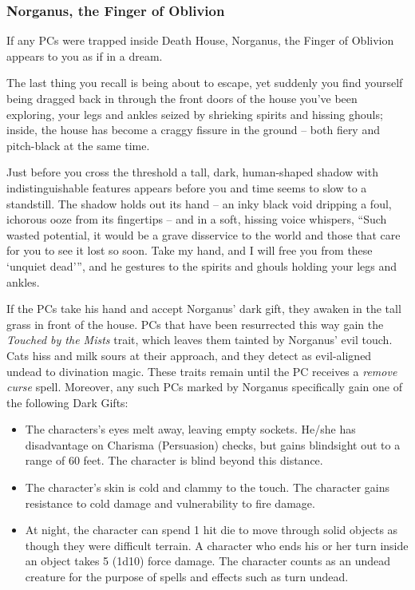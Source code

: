 \subsubsection*{Norganus, the Finger of Oblivion}
If any PCs were trapped inside Death House, Norganus, the Finger of Oblivion appears to you as if in a dream.
\begin{readout}
  The last thing you recall is being about to escape, yet suddenly you find yourself being dragged back in 
  through the front doors of the house you've been exploring, your legs and ankles seized by shrieking spirits 
  and hissing ghouls; inside, the house has become a craggy fissure in the ground -- both fiery and pitch-black 
  at the same time.
  
  Just before you cross the threshold a tall, dark, human-shaped shadow with indistinguishable features appears 
  before you and time seems to slow to a standstill. The shadow holds out its hand -- an inky black void dripping 
  a foul, ichorous ooze from its fingertips -- and in a soft, hissing voice whispers, ``Such wasted potential, it 
  would be a grave disservice to the world and those that care for you to see it lost so soon. Take my hand, and 
  I will free you from these `unquiet dead'{}'', and he gestures to the spirits and ghouls holding your legs and 
  ankles.
\end{readout}
If the PCs take his hand and accept Norganus' dark gift, they awaken in the tall grass in front of the house. PCs
that have been resurrected this way gain the \textit{Touched by the Mists} trait, which leaves them tainted by
Norganus' evil touch. Cats hiss and milk sours at their approach, and they detect as evil-aligned undead to
divination magic. These traits remain until the PC receives a \textit{remove curse} spell. Moreover, any such PCs
marked by Norganus specifically gain one of the following Dark Gifts:
\begin{itemize}
  \item The characters's eyes melt away, leaving empty sockets. He/she has disadvantage on Charisma (Persuasion) 
  checks, but gains blindsight out to a range of 60 feet. The character is blind beyond this distance.
  \item The character's skin is cold and clammy to the touch. The character gains resistance to cold damage and
  vulnerability to fire damage.
  \item At night, the character can spend 1 hit die to move through solid objects as though they were difficult
  terrain. A character who ends his or her turn inside an object takes 5 (1d10) force damage. The character
  counts as an undead creature for the purpose of spells and effects such as turn undead.
\end{itemize}

